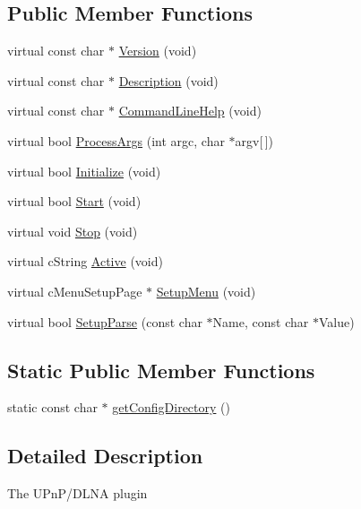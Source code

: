 \subsection*{Public Member Functions}
\begin{CompactItemize}
\item 
virtual const char $\ast$ \hyperlink{classcPluginUpnp_584844bf459ec3eb7f6037f9cbb52fd5}{Version} (void)
\item 
virtual const char $\ast$ \hyperlink{classcPluginUpnp_6fc36c7fdf1f0deed776897725bcda9b}{Description} (void)
\item 
virtual const char $\ast$ \hyperlink{classcPluginUpnp_e2e63843aab64e06ce9b533f4893f7e0}{CommandLineHelp} (void)
\item 
virtual bool \hyperlink{classcPluginUpnp_acbc8a8b3f67d08ed20ff1c8beaa4fe2}{ProcessArgs} (int argc, char $\ast$argv\mbox{[}$\,$\mbox{]})
\item 
virtual bool \hyperlink{classcPluginUpnp_3f3daf1d0cd8d176cf1a349b9de10df7}{Initialize} (void)
\item 
virtual bool \hyperlink{classcPluginUpnp_4738d8a5d72e56ec8b7b2f4f0b3549fe}{Start} (void)
\item 
virtual void \hyperlink{classcPluginUpnp_f59cbb0bb2a3872e33461fb46b4f79b4}{Stop} (void)
\item 
virtual cString \hyperlink{classcPluginUpnp_6b220cadefe502e7dfa4d70acea35083}{Active} (void)
\item 
virtual cMenuSetupPage $\ast$ \hyperlink{classcPluginUpnp_9b1891ed7e2d3aa56dae03b778d616ee}{SetupMenu} (void)
\item 
virtual bool \hyperlink{classcPluginUpnp_3f8b911f1e452789110e69b11587ebce}{SetupParse} (const char $\ast$Name, const char $\ast$Value)
\end{CompactItemize}
\subsection*{Static Public Member Functions}
\begin{CompactItemize}
\item 
static const char $\ast$ \hyperlink{classcPluginUpnp_ac2101984519b848cc04370b5527c145}{getConfigDirectory} ()
\end{CompactItemize}


\subsection{Detailed Description}
The UPnP/DLNA plugin

